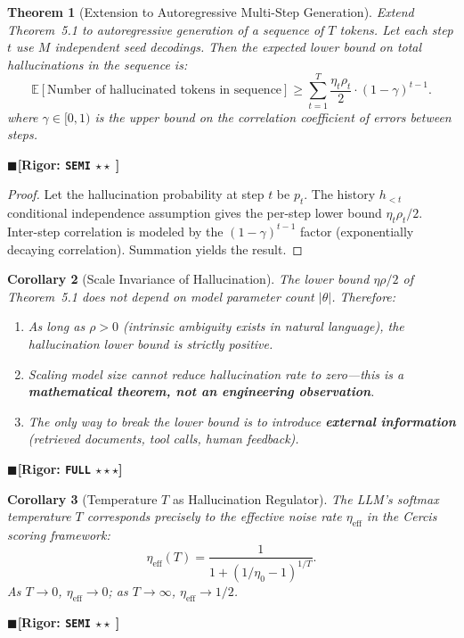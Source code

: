 \documentclass[12pt,a4paper]{article}
\newtheorem{theorem}{Theorem}[section]
\newtheorem{corollary}[theorem]{Corollary}
\theoremstyle{definition}
\theoremstyle{remark}
\newcommand{\rigorFull}{$\blacksquare$\;\textbf{[Rigor: \texttt{FULL} $\star\star\star$]}}
\newcommand{\rigorSemi}{$\blacksquare$\;\textbf{[Rigor: \texttt{SEMI} $\star\star\;$]}}
\begin{document}
\begin{theorem}[Extension to Autoregressive Multi-Step Generation]
\label{thm:5.2}
Extend Theorem~5.1 to autoregressive generation of a sequence of $T$ tokens. Let each step $t$ use $M$ independent seed decodings. Then the expected lower bound on total hallucinations in the sequence is:
\begin{equation}
\boxed{\mathbb{E}[\text{Number of hallucinated tokens in sequence}] \geq \sum_{t=1}^{T} \frac{\eta_t\rho_t}{2} \cdot (1 - \gamma)^{t-1}}.
\end{equation}
where $\gamma \in [0, 1)$ is the upper bound on the correlation coefficient of errors between steps.
\end{theorem}
\rigorSemi

\begin{proof}
Let the hallucination probability at step $t$ be $p_t$. The history $h_{<t}$ conditional independence assumption gives the per-step lower bound $\eta_t\rho_t/2$. Inter-step correlation is modeled by the $(1-\gamma)^{t-1}$ factor (exponentially decaying correlation). Summation yields the result.
\end{proof}

\begin{corollary}[Scale Invariance of Hallucination]
\label{cor:5.1}
The lower bound $\eta\rho/2$ of Theorem~5.1 does not depend on model parameter count $|\theta|$. Therefore:
\begin{enumerate}[label=\arabic*.]
\item As long as $\rho > 0$ (intrinsic ambiguity exists in natural language), the hallucination lower bound is strictly positive.
\item Scaling model size cannot reduce hallucination rate to zero---this is a \textbf{mathematical theorem, not an engineering observation}.
\item The only way to break the lower bound is to introduce \textbf{external information} (retrieved documents, tool calls, human feedback).
\end{enumerate}
\end{corollary}
\rigorFull

\begin{corollary}[Temperature $T$ as Hallucination Regulator]
\label{cor:5.2}
The LLM's softmax temperature $T$ corresponds precisely to the effective noise rate $\eta_{\text{eff}}$ in the Cercis scoring framework:
\begin{equation}
\eta_{\text{eff}}(T) = \frac{1}{1 + (1/\eta_0 - 1)^{1/T}}.
\end{equation}
As $T \to 0$, $\eta_{\text{eff}} \to 0$; as $T \to \infty$, $\eta_{\text{eff}} \to 1/2$.
\end{corollary}
\rigorSemi
\end{document}
